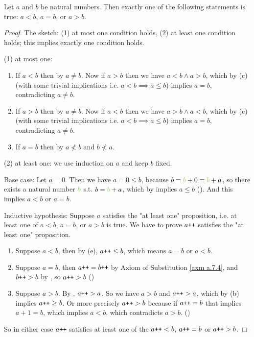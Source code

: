 \begin{proposition} \label{prop 2.2.13}
Let \(a\) and \(b\) be natural numbers. Then exactly one of the following statements is true: \(a < b\), \(a = b\), or \(a > b\).
\end{proposition}
\begin{proof}
The sketch: (1) at most one condition holds, (2) at least one condition holds; this implies exactly one condition holds.

(1) at most one:
    \begin{enumerate}
        \item If \(a < b\) then by  \(a \neq b\). Now if \(a > b\) then we have \(a < b \land a > b\), which by (c) (with some trivial implications i.e. \(a < b \implies a \leq b\)) implies \(a = b\), contradicting \(a \neq b\).
        \item If \(a > b\) then by  \(a \neq b\). Now if \(a < b\) then we have \(a > b \land a < b\), which by (c) (with some trivial implications i.e. \(a < b \implies a \leq b\)) implies \(a = b\), contradicting \(a \neq b\).
        \item If \(a = b\) then by  \(a \not < b \) and \(b \not < a\).
    \end{enumerate}

(2) at least one: we use induction on \(a\) and keep \(b\) fixed.

Base case: Let \(a = 0\). Then we have \(a = 0 \leq b\), because \(b = \GREEN{b} + 0 = \GREEN{b} + a\), so there exists a natural number \(\GREEN{b}\) s.t. \(b = \GREEN{b} + a\), which by  implies \(a \leq b\) (). And this implies \(a < b\) or \(a = b\).

Inductive hypothesis: Suppose \(a\) satisfies the "at least one" proposition, i.e. at least one of \(a < b\), \(a = b\), or \(a > b\) is true. We have to prove \(a\texttt{++}\) satisfies the "at least one" proposition.
    \begin{enumerate}
        \item Suppose \(a < b\), then by (e), \(a\texttt{++} \leq b\), which means \(a = b\) or \(a < b\).
        \item Suppose \(a = b\), then \(a\texttt{++} = b\texttt{++}\) by Axiom of Substitution \ref{axm a.7.4}, and \(b\texttt{++} > b\) by , so \(a\texttt{++} > b\) ()
        \item Suppose \(a > b\). By , \(a\texttt{++} > a\). So we have \(a > b\) and \(a\texttt{++} > a\), which by (b) implies \(a\texttt{++} \geq b\). Or more precisely \(a\texttt{++} > b\) because if \(a\texttt{++} = b\) that implies \(a + 1 = b\), which implies \(a < b\), which contradicts \(a > b\). ()
    \end{enumerate}
So in either case \(a\texttt{++}\) satisfies at least one of the \(a\texttt{++} < b\), \(a\texttt{++} = b\) or \(a\texttt{++} > b\).
\end{proof}


